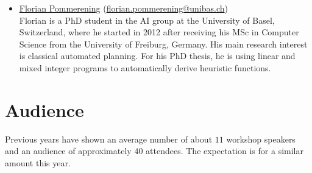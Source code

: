 \documentclass[10pt]{article}
\begin{document}
\begin{itemize}
\item \href{http://ai.cs.unibas.ch/people/pommeren}{Florian Pommerening}
  (\href{mailto:florian.pommerening@unibas.ch}{florian.pommerening@unibas.ch})\\
  Florian is a PhD student in the AI group at the University of Basel,
  Switzerland, where he started in 2012 after receiving his MSc in
  Computer Science from the University of Freiburg, Germany. His main
  research interest is classical automated planning. For his PhD
  thesis, he is using linear and mixed integer programs to
  automatically derive heuristic functions.

\end{itemize}

\section*{Audience}
Previous years have shown an average number of about $11$ workshop
speakers and an audience of approximately $40$ attendees. The
expectation is for a similar amount this year.
\end{document}
